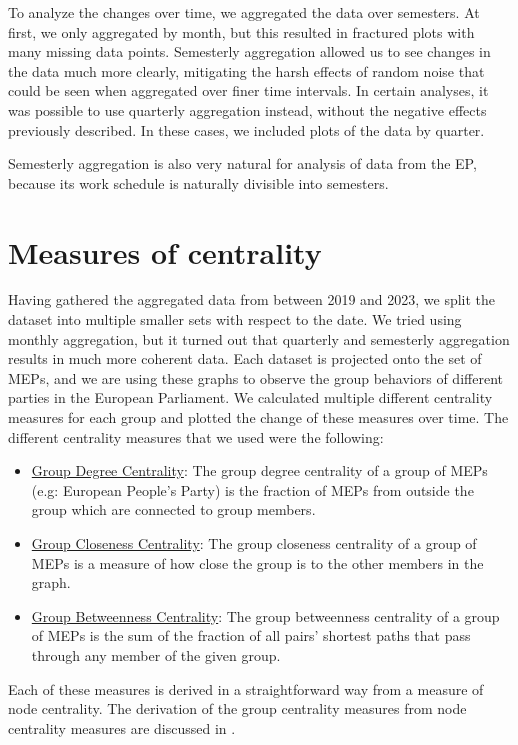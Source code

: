 \documentclass[lettersize,journal]{IEEEtran}
\begin{document}
To analyze the changes over time, we aggregated the data over semesters. At first, we only aggregated by month, but this resulted in fractured plots with many missing data points. Semesterly aggregation allowed us to see changes in the data much more clearly, mitigating the harsh effects of random noise that could be seen when aggregated over finer time intervals. In certain analyses, it was possible to use quarterly aggregation instead, without the negative effects previously described. In these cases, we included plots of the data by quarter.

Semesterly aggregation is also very natural for analysis of data from the EP, because its work schedule is naturally divisible into semesters.

\section{Measures of centrality} \label{sec:method}

Having gathered the aggregated data from between 2019 and 2023, we split the dataset into multiple smaller sets with respect to the date. We tried using monthly aggregation, but it turned out that quarterly and semesterly aggregation results in much more coherent data. Each dataset is projected onto the set of MEPs, and we are using these graphs to observe the group behaviors of different parties in the European Parliament. We calculated multiple different centrality measures for each group and plotted the change of these measures over time. The different centrality measures that we used were the following:

\begin{itemize}
\item \underline{Group Degree Centrality}: The group degree centrality of a group of MEPs (e.g: European People's Party) is the fraction of MEPs from outside the group which are connected to group members.
\item \underline{Group Closeness Centrality}: The group closeness centrality of a group of MEPs is a measure of how close the group is to the other members in the graph.
\item \underline{Group Betweenness Centrality}: The group betweenness centrality of a group of MEPs is the sum of the fraction of all pairs' shortest paths that pass through any member of the given group.
\end{itemize}

Each of these measures is derived in a straightforward way from a measure of node centrality. The derivation of the group centrality measures from node centrality measures are discussed in \cite{Centralities}.
\end{document}
